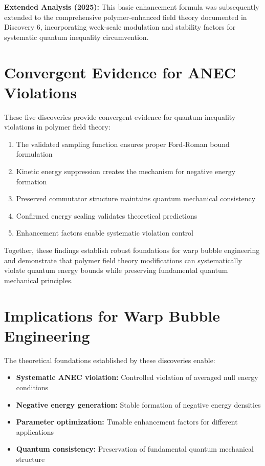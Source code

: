 \documentclass[11pt]{article}
\begin{document}
\textbf{Extended Analysis (2025):} This basic enhancement formula was subsequently extended to the comprehensive polymer-enhanced field theory documented in Discovery 6, incorporating week-scale modulation and stability factors for systematic quantum inequality circumvention.

\section{Convergent Evidence for ANEC Violations}

These five discoveries provide convergent evidence for quantum inequality violations in polymer field theory:

\begin{enumerate}
    \item The validated sampling function ensures proper Ford-Roman bound formulation
    \item Kinetic energy suppression creates the mechanism for negative energy formation
    \item Preserved commutator structure maintains quantum mechanical consistency
    \item Confirmed energy scaling validates theoretical predictions
    \item Enhancement factors enable systematic violation control
\end{enumerate}

Together, these findings establish robust foundations for warp bubble engineering and demonstrate that polymer field theory modifications can systematically violate quantum energy bounds while preserving fundamental quantum mechanical principles.

\section{Implications for Warp Bubble Engineering}

The theoretical foundations established by these discoveries enable:

\begin{itemize}
    \item \textbf{Systematic ANEC violation:} Controlled violation of averaged null energy conditions
    \item \textbf{Negative energy generation:} Stable formation of negative energy densities
    \item \textbf{Parameter optimization:} Tunable enhancement factors for different applications
    \item \textbf{Quantum consistency:} Preservation of fundamental quantum mechanical structure
\end{itemize}
\end{document}

